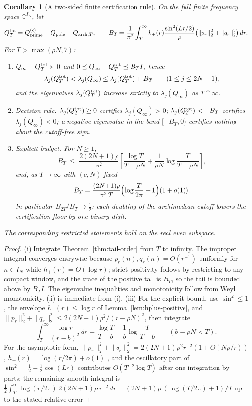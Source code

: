 \documentclass[11pt]{article}
\theoremstyle{plain}
\newtheorem{corollary}[theorem]{Corollary}
\theoremstyle{definition}
\theoremstyle{remark}
\newcommand{\C}{\mathbb C}
\newcommand{\dd}{\,d}
\newcommand{\Qinf}{Q_{\infty}}
\begin{document}
\begin{corollary}[A two-sided finite certification rule]\label{cor:tail-cert}
On the full finite frequency space $\C^{I_N}$, let
\[
        Q_T^{\rm tot}=Q_{\rm prime}^{(c)}+Q_{\rm pole}+Q_{{\rm arch},T},
\qquad
 B_T=
 \frac1{\pi^2}\int_T^\infty
 h_+(r)\frac{\sin^2(Lr/2)}{\rho}
        \bigl(\|p_r\|_2^2+\|q_r\|_2^2\bigr)\dd r .
\]
For $T>\max(\rho N,7)$:
\begin{enumerate}
\item[(i)] $\Qinf-Q_T^{\rm tot}\succ0$ and
$0\preceq \Qinf-Q_T^{\rm tot}\preceq B_TI$, hence
\[
        \lambda_j(Q_T^{\rm tot})<\lambda_j(\Qinf)
        \le\lambda_j(Q_T^{\rm tot})+B_T
        \qquad(1\le j\le 2N+1),
\]
and the eigenvalues $\lambda_j(Q_T^{\rm tot})$ increase strictly to $\lambda_j(\Qinf)$ as $T\uparrow\infty$.
\item[(ii)] \emph{Decision rule.}
$\lambda_j(Q_T^{\rm tot})\ge0$ certifies $\lambda_j(\Qinf)>0$;
$\lambda_j(Q_T^{\rm tot})<-B_T$ certifies $\lambda_j(\Qinf)<0$;
a negative eigenvalue in the band $[-B_T,0)$ certifies nothing about the
cutoff-free sign.
\item[(iii)] \emph{Explicit budget.}  For $N\ge1$,
\[
 B_T\;\le\;\frac{2(2N{+}1)\rho}{\pi^2}
 \left[
 \frac{\log T}{T-\rho N}
 +\frac{1}{\rho N}\log\frac{T}{T-\rho N}
 \right],
\]
and, as $T\to\infty$ with $(c,N)$ fixed,
\[
 B_T=\frac{(2N{+}1)\rho}{\pi^2\,T}\Bigl(\log\frac{T}{2\pi}+1\Bigr)(1+o(1)).
\]
In particular $B_{2T}/B_T\to\tfrac12$: each doubling of the archimedean
cutoff lowers the certification floor by one binary digit.
\end{enumerate}
The corresponding restricted statements hold on the real even subspace.
\end{corollary}

\begin{proof}
(i) Integrate Theorem~\ref{thm:tail-order} from $T$ to infinity.  The
improper integral converges entrywise because
$p_r(n),q_r(n)=O(r^{-1})$ uniformly for $n\in I_N$ while $h_+(r)=O(\log r)$;
strict positivity follows by restricting to any compact window, and the trace
of the positive tail is $B_T$, so the tail is bounded above by $B_TI$.  The
eigenvalue inequalities and monotonicity follow from Weyl monotonicity.
(ii) is immediate from (i).
(iii) For the explicit bound, use $\sin^2\le1$, the envelope
$h_+(r)\le\log r$ of Lemma~\ref{lem:hplus-positive}, and
$\|p_r\|_2^2+\|q_r\|_2^2\le 2(2N{+}1)\rho^2/(r-\rho N)^2$, then integrate
\[
 \int_T^\infty\frac{\log r}{(r-b)^2}\dd r
 =\frac{\log T}{T-b}+\frac1b\log\frac{T}{T-b}
 \qquad(b=\rho N<T).
\]
For the asymptotic form, $\|p_r\|_2^2+\|q_r\|_2^2
=2(2N{+}1)\rho^2r^{-2}(1+O(N\rho/r))$,
$h_+(r)=\log(r/2\pi)+o(1)$ \cite{DLMFDigammaAsymptotic}, and the oscillatory
part of $\sin^2=\tfrac12-\tfrac12\cos(Lr)$ contributes $O(T^{-2}\log T)$
after one integration by parts; the remaining smooth integral is
$\tfrac12\int_T^\infty\log(r/2\pi)\,2(2N{+}1)\rho\,r^{-2}\dd r
=(2N{+}1)\rho\,(\log(T/2\pi)+1)/T$ up to the stated relative error.
\end{proof}
\end{document}
